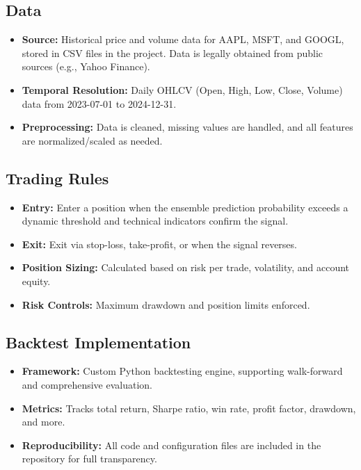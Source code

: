 \documentclass[conference]{IEEEtran}
\begin{document}
\subsection{Data}
\begin{itemize}
    \item \textbf{Source:} Historical price and volume data for AAPL, MSFT, and GOOGL, stored in CSV files in the project. Data is legally obtained from public sources (e.g., Yahoo Finance).
    \item \textbf{Temporal Resolution:} Daily OHLCV (Open, High, Low, Close, Volume) data from 2023-07-01 to 2024-12-31.
    \item \textbf{Preprocessing:} Data is cleaned, missing values are handled, and all features are normalized/scaled as needed.
\end{itemize}

\subsection{Trading Rules}
\begin{itemize}
    \item \textbf{Entry:} Enter a position when the ensemble prediction probability exceeds a dynamic threshold and technical indicators confirm the signal.
    \item \textbf{Exit:} Exit via stop-loss, take-profit, or when the signal reverses.
    \item \textbf{Position Sizing:} Calculated based on risk per trade, volatility, and account equity.
    \item \textbf{Risk Controls:} Maximum drawdown and position limits enforced.
\end{itemize}

\subsection{Backtest Implementation}
\begin{itemize}
    \item \textbf{Framework:} Custom Python backtesting engine, supporting walk-forward and comprehensive evaluation.
    \item \textbf{Metrics:} Tracks total return, Sharpe ratio, win rate, profit factor, drawdown, and more.
    \item \textbf{Reproducibility:} All code and configuration files are included in the repository for full transparency.
\end{itemize}
\end{document}
